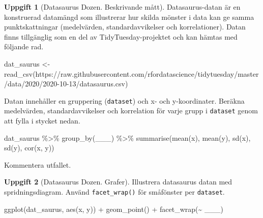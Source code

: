 \documentclass[
]{book}
\newenvironment{Shaded}{\begin{snugshade}}{\end{snugshade}}
\newcommand{\FunctionTok}[1]{\textcolor[rgb]{0.00,0.00,0.00}{#1}}
\newcommand{\NormalTok}[1]{#1}
\newcommand{\OtherTok}[1]{\textcolor[rgb]{0.56,0.35,0.01}{#1}}
\newcommand{\SpecialCharTok}[1]{\textcolor[rgb]{0.00,0.00,0.00}{#1}}
\newcommand{\StringTok}[1]{\textcolor[rgb]{0.31,0.60,0.02}{#1}}
\theoremstyle{definition}
\theoremstyle{definition}
\theoremstyle{definition}
\newtheorem{exercise}{Uppgift}[chapter]
\theoremstyle{definition}
\theoremstyle{remark}
\begin{document}
\begin{exercise}[Datasaurus Dozen. Beskrivande mått]
Datasaurus-datan är en konstruerad datamängd som illustrerar hur skilda mönster i data kan ge samma punktskattningar (medelvärden, standardavvikelser och korrelationer). Datan finns tillgänglig som en del av TidyTuesday-projektet och kan hämtas med följande rad.

\begin{Shaded}
\begin{Highlighting}[]
\NormalTok{dat\_saurus }\OtherTok{\textless{}{-}} \FunctionTok{read\_csv}\NormalTok{(}\StringTok{\textquotesingle{}https://raw.githubusercontent.com/rfordatascience/tidytuesday/master/data/2020/2020{-}10{-}13/datasaurus.csv\textquotesingle{}}\NormalTok{)}
\end{Highlighting}
\end{Shaded}

Datan innehåller en gruppering (\texttt{dataset}) och x- och y-koordinater. Beräkna medelvärden, standardavvikelser och korrelation för varje grupp i \texttt{dataset} genom att fylla i stycket nedan.

\begin{Shaded}
\begin{Highlighting}[]
\NormalTok{dat\_saurus }\SpecialCharTok{\%\textgreater{}\%} 
  \FunctionTok{group\_by}\NormalTok{(\_\_\_) }\SpecialCharTok{\%\textgreater{}\%} 
  \FunctionTok{summarise}\NormalTok{(}\FunctionTok{mean}\NormalTok{(x), }\FunctionTok{mean}\NormalTok{(y), }\FunctionTok{sd}\NormalTok{(x), }\FunctionTok{sd}\NormalTok{(y), }\FunctionTok{cor}\NormalTok{(x, y))}
\end{Highlighting}
\end{Shaded}

Kommentera utfallet.
\end{exercise}

\begin{exercise}[Datasaurus Dozen. Grafer]

Illustrera datasaurus datan med spridningsdiagram. Använd \texttt{facet\_wrap()} för småfönster per \texttt{dataset}.

\begin{Shaded}
\begin{Highlighting}[]
\FunctionTok{ggplot}\NormalTok{(dat\_saurus, }\FunctionTok{aes}\NormalTok{(x, y)) }\SpecialCharTok{+}
  \FunctionTok{geom\_point}\NormalTok{() }\SpecialCharTok{+}
  \FunctionTok{facet\_wrap}\NormalTok{(}\SpecialCharTok{\textasciitilde{}}\NormalTok{ \_\_\_)}
\end{Highlighting}
\end{Shaded}

\end{exercise}
\end{document}
